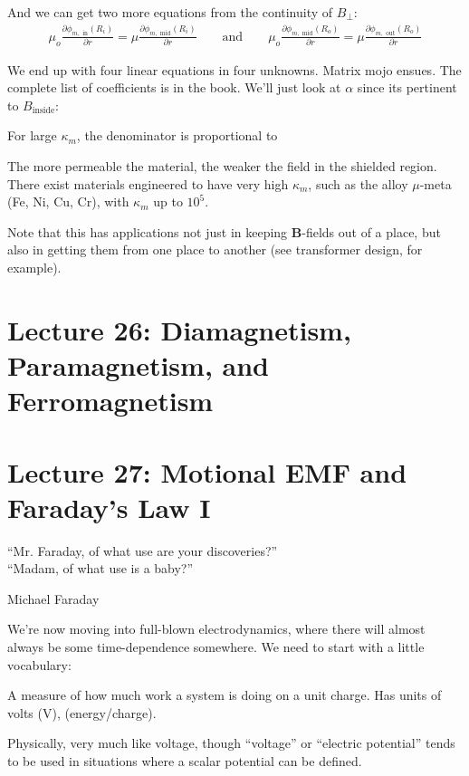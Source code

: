 \documentclass{article}
\numberwithin{equation}{section}
\begin{document}
And we can get two more equations from the continuity of $B_{\perp}$:
\begin{gather*}
    \mu_o \frac{\partial \phi_{m, \text{ in}} (R_i)}{\partial r} = \mu \frac{\partial \phi_{m, \text{ mid}} (R_i)}{\partial r} \qquad \text{and} \qquad \mu_o \frac{\partial \phi_{m, \text{ mid}} (R_o)}{\partial r} = \mu \frac{\partial \phi_{m, \text{ out}} (R_o)}{\partial r}
\end{gather*}

We end up with four linear equations in four unknowns. Matrix mojo ensues. The complete list of coefficients is in the book. We'll just look at $\alpha$ since its pertinent to $B_{\text{inside}}$:

For large $\kappa_m$, the denominator is proportional to

The more permeable the material, the weaker the field in the shielded region. There exist materials engineered to have very high $\kappa_m$, such as the alloy $\mu$-meta (Fe, Ni, Cu, Cr), with $\kappa_m$ up to $10^5$.

Note that this has applications not just in keeping $\bm{B}$-fields out of a place, but also in getting them from one place to another (see transformer design, for example).

\newpage

\section*{Lecture 26: Diamagnetism, Paramagnetism, and Ferromagnetism}
\setcounter{page}{1}

\newpage

\section*{Lecture 27: Motional EMF and Faraday's Law I}
\setcounter{page}{1}

\epigraph{``Mr. Faraday, of what use are your discoveries?'' \\ ``Madam, of what use is a baby?''}{Michael Faraday}

We're now moving into full-blown electrodynamics, where there will almost always be some time-dependence somewhere. We need to start with a little vocabulary:

\begin{mdframed}[backgroundcolor=WHITE,align=left,userdefinedwidth=45em, topline=false, rightline=false,frametitle={Electromotive Force (emf)}]

A measure of how much work a system is doing on a unit charge. Has units of volts (V), (energy/charge).

Physically, very much like voltage, though ``voltage'' or ``electric potential'' tends to be used in situations where a scalar potential can be defined.

\end{mdframed}
\end{document}

